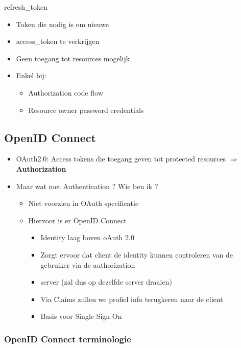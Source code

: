 \documentclass{article}
\begin{document}
refresh\_token

\begin{itemize}
    \item Token die nodig is om nieuwe
    \item access\_token te verkrijgen
    \item Geen toegang tot resources mogelijk
    \item Enkel bij:
    \begin{itemize}
        \item Authorization code flow
        \item Resource owner password credentials
    \end{itemize}
\end{itemize}


\subsection{OpenID Connect}

\begin{itemize}
    \item OAuth2.0: Access tokens die toegang geven tot protected resources $\Rightarrow$ \textbf{Authorization}
    \item Maar wat met Authentication ? Wie ben ik ?
    \begin{itemize}
        \item Niet voorzien in OAuth specificatie
        \item Hiervoor is er OpenID Connect
        \begin{itemize}
            \item Identity laag boven oAuth 2.0
            \item Zorgt ervoor dat client de identity kunnen controleren van de gebruiker via de authorization
            \item server (zal dus op dezelfde server draaien)
            \item Via Claims zullen we profiel info terugkeren naar de client
            \item Basis voor Single Sign On
        \end{itemize}
    \end{itemize}
\end{itemize}

\subsubsection{OpenID Connect terminologie}
\end{document}
